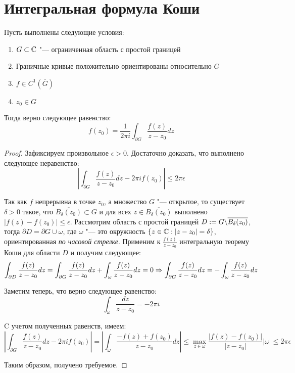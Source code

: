 \section{Интегральная формула Коши}

\begin{theorem}
	Пусть выполнены следующие условия:
	\begin{enumerate}
		\item $G \subset \mathbb{C}$ "--- ограниченная область с простой границей
		
		\item Граничные кривые положительно ориентированы относительно $G$
		
		\item $f \in C^1(\overline{G})$
		
		\item $z_0 \in G$
	\end{enumerate}
	
	Тогда верно следующее равенство:
	\[f(z_0) = \frac{1}{2\pi i}\int_{\partial G}\frac{f(z)}{z - z_0}dz\]
\end{theorem}

\begin{proof}
	Зафиксируем произвольное $\epsilon > 0$. Достаточно доказать, что выполнено следующее неравенство:
	\[\left|\int_{\partial G}\frac{f(z)}{z - z_0}dz - 2\pi if(z_0)\right| \le 2\pi\epsilon\]
	
	Так как $f$ непрерывна в точке $z_0$, а множество $G$ "--- открытое, то существует $\delta > 0$ такое, что $\overline{B_\delta(z_0)} \subset G$ и для всех $z \in \overline{B_\delta(z_0)}$ выполнено $|f(z) - f(z_0)| \le \epsilon$. Рассмотрим область с простой границей $D := G \backslash \overline{B_\delta(z_0)}$, тогда $\partial D = \partial G \cup \omega$, где $\omega$ "--- это окружность $\{z \in \mathbb{C}: |z - z_0| = \delta\}$, ориентированная \textit{по часовой стрелке}. Применим к $\frac{f(z)}{z - z_0}$ интегральную теорему Коши для области $D$ и получим следующее:
	\[\int_{\partial D}\frac{f(z)}{z - z_0}dz = \int_{\partial G}\frac{f(z)}{z - z_0}dz + \int_{\omega}\frac{f(z)}{z - z_0}dz = 0 \Rightarrow \int_{\partial G}\frac{f(z)}{z - z_0}dz = -\int_{\omega}\frac{f(z)}{z - z_0}dz\]
	
	Заметим теперь, что верно следующее равенство:
	\[\int_{\omega}\frac{dz}{z - z_0} = -2\pi i\]
	
	C учетом полученных равенств, имеем:
	\[\left|\int_{\partial G}\frac{f(z)}{z - z_0}dz - 2\pi if(z_0)\right| = \left|\int_{\omega}\frac{-f(z) + f(z_0)}{z - z_0}dz\right| \le \max_{z \in \omega}\frac{|f(z) - f(z_0)|}{|z - z_0|}|\omega| \le 2\pi\epsilon\]
	
	Таким образом, получено требуемое.
\end{proof}

